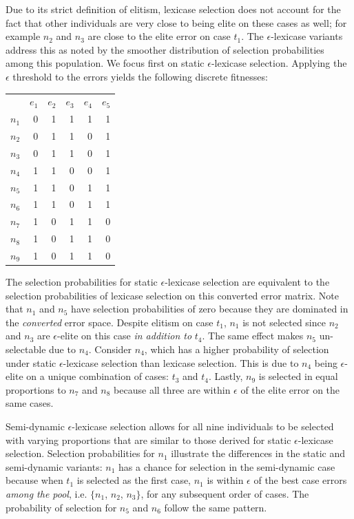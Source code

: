 \documentclass[twoside]{article}
\begin{document}
Due to its strict definition of elitism, lexicase selection does not account for the fact that other individuals are very close to being elite on these cases as well; for example $n_2$ and $n_3$ are close to the elite error on case $t_1$. The $\epsilon$-lexicase variants address this as noted by the smoother distribution of selection probabilities among this population. We focus first on static $\epsilon$-lexicase selection. Applying the $\epsilon$ threshold to the errors yields the following discrete fitnesses:
\begin{center}
\begin{tabular}{lrrrrr}
& $e_1$ & $e_2$ & $e_3$ & $e_4$ & $e_5$ \\
$n_1$	&0	&	1	&	1	&	1	&	1\\ 
$n_2$	&0	&	1	&	1	&	0	&	1\\ 
$n_3$	&0	&	1	&	1	&	0	&	1\\ 
$n_4$	&1	&	1	&	0	&	0	&	1\\ 
$n_5$	&1	&	1	&	0	&	1	&	1\\ 
$n_6$	&1	&	1	&	0	&	1	&	1\\ 
$n_7$	&1	&	0	&	1	&	1	&	0\\ 
$n_8$	&1	&	0	&	1	&	1	&	0\\ 
$n_9$	&1	&	0	&	1	&	1	&	0\\ 
\end{tabular}
\end{center}

The selection probabilities for static $\epsilon$-lexicase selection are equivalent to the selection probabilities of lexicase selection on this converted error matrix. Note that $n_1$ and $n_5$ have selection probabilities of zero because they are dominated in the {\it converted} error space. Despite elitism on case $t_1$, $n_1$ is not selected since $n_2$ and $n_3$ are $\epsilon$-elite on this case {\it in addition to} $t_4$. The same effect makes $n_5$ un-selectable due to $n_4$. Consider $n_4$, which has a higher probability of selection under static $\epsilon$-lexicase selection than lexicase selection. This is due to $n_4$ being $\epsilon$-elite on a unique combination of cases: $t_3$ and $t_4$. Lastly, $n_9$ is selected in equal proportions to $n_7$ and $n_8$ because all three are within $\epsilon$ of the elite error on the same cases. 

Semi-dynamic $\epsilon$-lexicase selection allows for all nine individuals to be selected with varying proportions that are similar to those derived for static $\epsilon$-lexicase selection. Selection probabilities for $n_1$ illustrate the differences in the static and semi-dynamic variants: $n_1$ has a chance for selection in the semi-dynamic case because when $t_1$ is selected as the first case, $n_1$ is within $\epsilon$ of the best case errors {\it among the pool}, i.e. $\{n_1$, $n_2$, $n_3\}$, for any subsequent order of cases. The probability of selection for $n_5$ and $n_6$ follow the same pattern.
\end{document}
